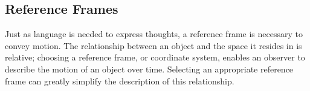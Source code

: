 \documentclass[12pt]{ucthesis}
\begin{document}
%
\subsection{Reference Frames}
\label{subsec: ref}
Just as language is needed to express thoughts, a reference frame is necessary to convey motion. The relationship between an object and the space it resides in is relative; choosing a reference frame, or coordinate system, enables an observer to describe the motion of an object over time. Selecting an appropriate reference frame can greatly simplify the description of this relationship.

\end{document}
